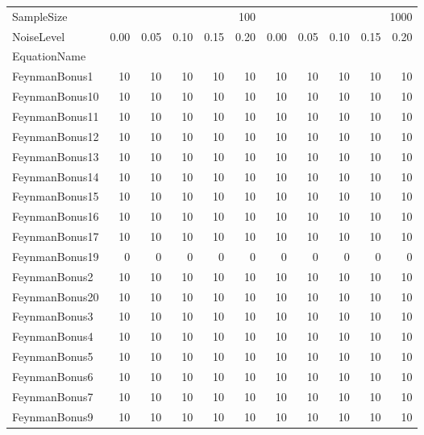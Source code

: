 \begin{tabular}{lrrrrrrrrrr}
\toprule
SampleSize & \multicolumn{5}{r}{100} & \multicolumn{5}{r}{1000} \\
NoiseLevel & 0.00 & 0.05 & 0.10 & 0.15 & 0.20 & 0.00 & 0.05 & 0.10 & 0.15 & 0.20 \\
EquationName &  &  &  &  &  &  &  &  &  &  \\
\midrule
FeynmanBonus1 & 10 & 10 & 10 & 10 & 10 & 10 & 10 & 10 & 10 & 10 \\
FeynmanBonus10 & 10 & 10 & 10 & 10 & 10 & 10 & 10 & 10 & 10 & 10 \\
FeynmanBonus11 & 10 & 10 & 10 & 10 & 10 & 10 & 10 & 10 & 10 & 10 \\
FeynmanBonus12 & 10 & 10 & 10 & 10 & 10 & 10 & 10 & 10 & 10 & 10 \\
FeynmanBonus13 & 10 & 10 & 10 & 10 & 10 & 10 & 10 & 10 & 10 & 10 \\
FeynmanBonus14 & 10 & 10 & 10 & 10 & 10 & 10 & 10 & 10 & 10 & 10 \\
FeynmanBonus15 & 10 & 10 & 10 & 10 & 10 & 10 & 10 & 10 & 10 & 10 \\
FeynmanBonus16 & 10 & 10 & 10 & 10 & 10 & 10 & 10 & 10 & 10 & 10 \\
FeynmanBonus17 & 10 & 10 & 10 & 10 & 10 & 10 & 10 & 10 & 10 & 10 \\
FeynmanBonus19 & 0 & 0 & 0 & 0 & 0 & 0 & 0 & 0 & 0 & 0 \\
FeynmanBonus2 & 10 & 10 & 10 & 10 & 10 & 10 & 10 & 10 & 10 & 10 \\
FeynmanBonus20 & 10 & 10 & 10 & 10 & 10 & 10 & 10 & 10 & 10 & 10 \\
FeynmanBonus3 & 10 & 10 & 10 & 10 & 10 & 10 & 10 & 10 & 10 & 10 \\
FeynmanBonus4 & 10 & 10 & 10 & 10 & 10 & 10 & 10 & 10 & 10 & 10 \\
FeynmanBonus5 & 10 & 10 & 10 & 10 & 10 & 10 & 10 & 10 & 10 & 10 \\
FeynmanBonus6 & 10 & 10 & 10 & 10 & 10 & 10 & 10 & 10 & 10 & 10 \\
FeynmanBonus7 & 10 & 10 & 10 & 10 & 10 & 10 & 10 & 10 & 10 & 10 \\
FeynmanBonus9 & 10 & 10 & 10 & 10 & 10 & 10 & 10 & 10 & 10 & 10 \\
\bottomrule
\end{tabular}
